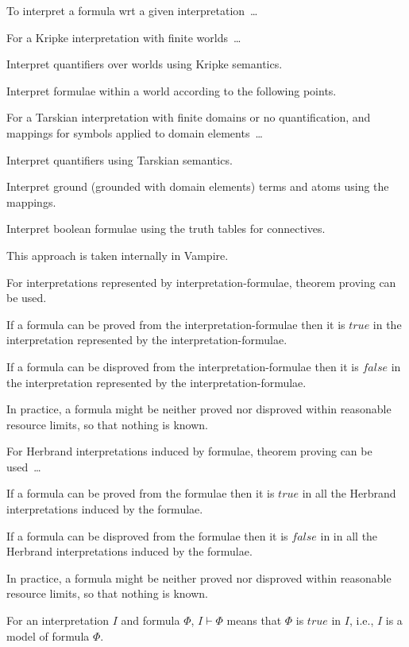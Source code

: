 \documentclass{easychair}
\newenvironment{packed_itemize}{
\vspace*{-0.2em}
\begin{itemize}
\setlength{\partopsep}{0pt}
\setlength{\itemsep}{1pt}
\setlength{\parskip}{0pt}
\setlength{\parsep}{0pt}
}{\end{itemize}}
\begin{document}
To interpret a formula wrt a given interpretation~\ldots
\begin{packed_itemize}
\item For a Kripke interpretation with finite worlds~\ldots
      \begin{packed_itemize}
      \item Interpret quantifiers over worlds using Kripke semantics.
      \item Interpret formulae within a world according to the following points.
      \end{packed_itemize}
\item For a Tarskian interpretation with finite domains or no quantification, and mappings for 
      symbols applied to domain elements~\ldots
      \begin{packed_itemize}
      \item Interpret quantifiers using Tarskian semantics.
      \item Interpret ground (grounded with domain elements) terms and atoms using the mappings.
      \item Interpret boolean formulae using the truth tables for connectives.
      \end{packed_itemize}
      This approach is taken internally in Vampire.
\item For interpretations represented by interpretation-formulae, theorem proving can be used.
      \begin{packed_itemize}
      \item If a formula can be proved from the interpretation-formulae then it is $true$ in the 
            interpretation represented by the interpretation-formulae.
      \item If a formula can be disproved from the interpretation-formulae then it is $false$ in 
            the interpretation represented by the interpretation-formulae.
      \item In practice, a formula might be neither proved nor disproved within reasonable 
            resource limits, so that nothing is known.
      \end{packed_itemize}
\item For Herbrand interpretations induced by formulae, theorem proving can be used~\ldots
      \begin{packed_itemize}
      \item If a formula can be proved from the formulae then it is $true$ in all the Herbrand 
            interpretations induced by the formulae.
      \item If a formula can be disproved from the formulae then it is $false$ in in all the 
            Herbrand interpretations induced by the formulae.
      \item In practice, a formula might be neither proved nor disproved within reasonable 
            resource limits, so that nothing is known.
      \end{packed_itemize}
\end{packed_itemize}
For an interpretation $I$ and formula $\Phi$, $I \vdash \Phi$ means that $\Phi$ is $true$ in $I$, 
i.e., $I$ is a model of formula $\Phi$.
\end{document}
